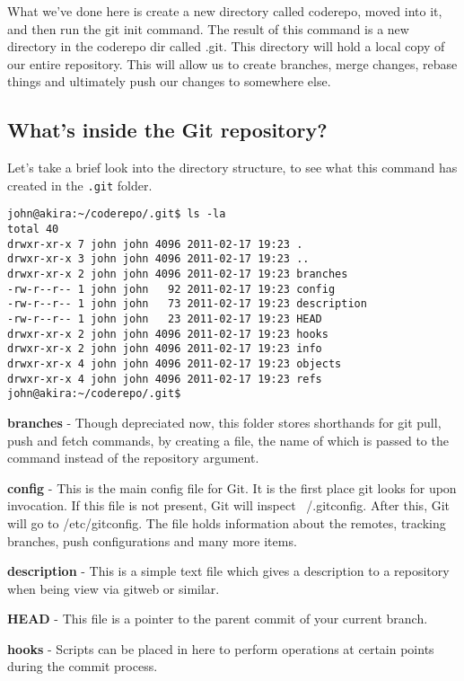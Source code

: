 What we've done here is create a new directory called coderepo, moved into it, and then run the git init command.  The result of this command is a new directory in the coderepo dir called .git.  This directory will hold a local copy of our entire repository.  This will allow us to create branches, merge changes, rebase things and ultimately push our changes to somewhere else.


\subsection*{What's inside the Git repository?}

Let's take a brief look into the directory structure, to see what this command has created in the \texttt{.git} folder.

\begin{verbatim} 
john@akira:~/coderepo/.git$ ls -la 
total 40 
drwxr-xr-x 7 john john 4096 2011-02-17 19:23 . 
drwxr-xr-x 3 john john 4096 2011-02-17 19:23 .. 
drwxr-xr-x 2 john john 4096 2011-02-17 19:23 branches 
-rw-r--r-- 1 john john   92 2011-02-17 19:23 config 
-rw-r--r-- 1 john john   73 2011-02-17 19:23 description 
-rw-r--r-- 1 john john   23 2011-02-17 19:23 HEAD 
drwxr-xr-x 2 john john 4096 2011-02-17 19:23 hooks 
drwxr-xr-x 2 john john 4096 2011-02-17 19:23 info 
drwxr-xr-x 4 john john 4096 2011-02-17 19:23 objects 
drwxr-xr-x 4 john john 4096 2011-02-17 19:23 refs 
john@akira:~/coderepo/.git$ 
\end{verbatim} 

\textbf{branches} - Though depreciated now, this folder stores shorthands for git pull, push and fetch commands, by creating a file, the name of which is passed to the command instead of the repository argument.

\textbf{config} - This is the main config file for Git.  It is the first place git looks for upon invocation.  If this file is not present, Git will inspect ~/.gitconfig.  After this, Git will go to /etc/gitconfig.  The file holds information about the remotes, tracking branches, push configurations and many more items.

\textbf{description} - This is a simple text file which gives a description to a repository when being view via gitweb or similar.

\textbf{HEAD} - This file is a pointer to the parent commit of your current branch.

\textbf{hooks} - Scripts can be placed in here to perform operations at certain points during the commit process.

